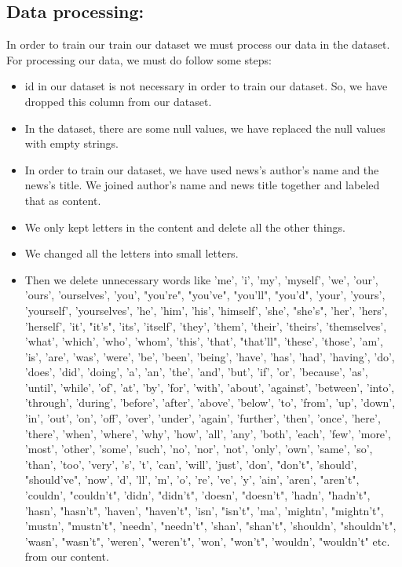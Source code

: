 \documentclass{article}
\begin{document}
   \subsection{Data processing:}
   In order to train our train our dataset we must process our data in the dataset. For processing our data, we must do follow some steps:
   \begin{itemize}
    \item id in our dataset is not necessary in order to train our dataset. So, we have dropped this column from our dataset.
    \item In the dataset, there are some null values, we have replaced the null values with empty strings.
    \item In order to train our dataset, we have used news’s author’s name and the news’s title. We joined author’s name and news title together and labeled that as content. 
    \item We only kept letters in the content and delete all the other things.
    \item We changed all the letters into small letters.
    \item Then we delete unnecessary words like  'me', 'i', 'my', 'myself', 'we', 'our', 'ours', 'ourselves', 'you', "you're", "you've", "you'll", "you'd", 'your', 'yours', 'yourself', 'yourselves', 'he', 'him', 'his', 'himself', 'she', "she's", 'her', 'hers', 'herself', 'it', "it's", 'its', 'itself', 'they', 'them', 'their', 'theirs', 'themselves', 'what', 'which', 'who', 'whom', 'this', 'that', "that'll", 'these', 'those', 'am', 'is', 'are', 'was', 'were', 'be', 'been', 'being', 'have', 'has', 'had', 'having', 'do', 'does', 'did', 'doing', 'a', 'an', 'the', 'and', 'but', 'if', 'or', 'because', 'as', 'until', 'while', 'of', 'at', 'by', 'for', 'with', 'about', 'against', 'between', 'into', 'through', 'during', 'before', 'after', 'above', 'below', 'to', 'from', 'up', 'down', 'in', 'out', 'on', 'off', 'over', 'under', 'again', 'further', 'then', 'once', 'here', 'there', 'when', 'where', 'why', 'how', 'all', 'any', 'both', 'each', 'few', 'more', 'most', 'other', 'some', 'such', 'no', 'nor', 'not', 'only', 'own', 'same', 'so', 'than', 'too', 'very', 's', 't', 'can', 'will', 'just', 'don', "don't", 'should', "should've", 'now', 'd', 'll', 'm', 'o', 're', 've', 'y', 'ain', 'aren', "aren't", 'couldn', "couldn't", 'didn', "didn't", 'doesn', "doesn't", 'hadn', "hadn't", 'hasn', "hasn't", 'haven', "haven't", 'isn', "isn't", 'ma', 'mightn', "mightn't", 'mustn', "mustn't", 'needn', "needn't", 'shan', "shan't", 'shouldn', "shouldn't", 'wasn', "wasn't", 'weren', "weren't", 'won', "won't", 'wouldn', "wouldn't" etc. from our content.
    \end{itemize}\break
\end{document}
